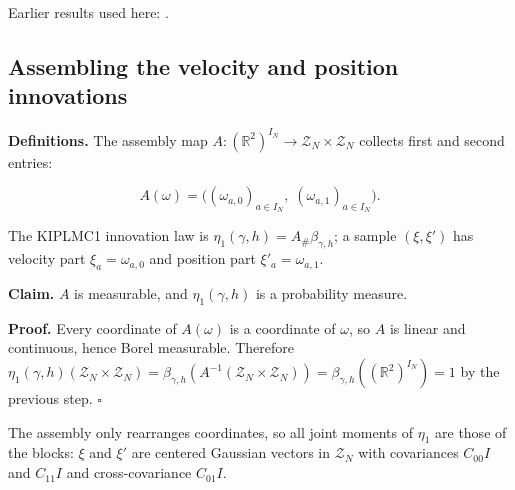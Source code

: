 \documentclass[11pt,a4paper]{report}
\begin{document}
Earlier results used here: \cite[Section~3.26.3]{LangevinLean2026Kinetic}.
\subsection{\texorpdfstring{Assembling the velocity and position innovations}{Assembling the velocity and position innovations}}
\label{report-step-KIPLMC-Noise-lean-2}


\textbf{Definitions.} The assembly map \(A:(\mathbb R^2)^{I_N}\to\mathcal Z_N\times\mathcal Z_N\) collects first and second entries:


\[A(\omega)=\bigl((\omega_{a,0})_{a\in I_N},\;(\omega_{a,1})_{a\in I_N}\bigr).\]


The KIPLMC1 innovation law is \(\eta_1(\gamma,h)=A_\#\beta_{\gamma,h}\); a sample \((\xi,\xi')\) has velocity part \(\xi_a=\omega_{a,0}\) and position part \(\xi'_a=\omega_{a,1}\).




\textbf{Claim.} \(A\) is measurable, and \(\eta_1(\gamma,h)\) is a probability measure.




\textbf{Proof.} Every coordinate of \(A(\omega)\) is a coordinate of \(\omega\), so \(A\) is linear and continuous, hence Borel measurable. Therefore \(\eta_1(\gamma,h)(\mathcal Z_N\times\mathcal Z_N)=\beta_{\gamma,h}(A^{-1}(\mathcal Z_N\times\mathcal Z_N))=\beta_{\gamma,h}((\mathbb R^2)^{I_N})=1\) by the previous step. \(\square\)




The assembly only rearranges coordinates, so all joint moments of \(\eta_1\) are those of the blocks: \(\xi\) and \(\xi'\) are centered Gaussian vectors in \(\mathcal Z_N\) with covariances \(C_{00}I\) and \(C_{11}I\) and cross-covariance \(C_{01}I\).
\end{document}
